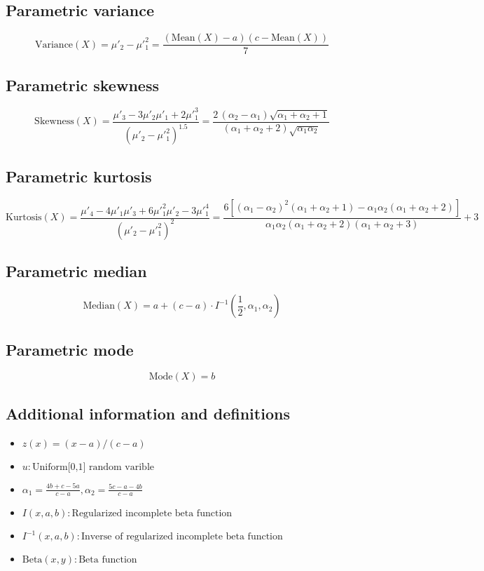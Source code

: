 \documentclass{article}
\begin{document}
\subsection{Parametric variance}
\begin{equation*} \mathrm{Variance}(X)=\mu'_{2}-\mu'^{2}_{1}=\frac{(\mathrm{Mean}(X)-a)(c-\mathrm{Mean}(X))}{7} \end{equation*}
\subsection{Parametric skewness}
\begin{equation*} \mathrm{Skewness}(X)=\frac{\mu'_{3}-3\mu'_{2}\mu'_{1}+2\mu'^{3}_{1}}{(\mu'_{2}-\mu'^{2}_{1})^{1.5}}=\frac{2\,(\alpha_{2}-\alpha_{1})\sqrt{\alpha_{1}+\alpha_{2}+1}}{(\alpha_{1}+\alpha_{2}+2)\sqrt{\alpha_{1}\alpha_{2}}} \end{equation*}
\subsection{Parametric kurtosis}
\begin{equation*} \mathrm{Kurtosis}(X)=\frac{\mu'_{4}-4\mu'_{1}\mu'_{3}+6\mu'^{2}_{1}\mu'_{2}-3\mu'^{4}_{1}}{(\mu'_{2}-\mu'^{2}_{1})^{2}}=\frac{6[(\alpha_{1}-\alpha_{2})^2 (\alpha_{1} +\alpha_{2}+1)-\alpha_{1} \alpha_{2} (\alpha_{1}+\alpha_{2}+2)]}{\alpha_{1} \alpha_{2} (\alpha_{1}+\alpha_{2}+2) (\alpha_{1}+\alpha_{2}+3)}+3 \end{equation*}
\subsection{Parametric median}
\begin{equation*} \mathrm{Median}(X)=a+(c-a)\cdot I^{-1}\left(\frac{1}{2},\alpha_{1},\alpha_{2}\right) \end{equation*}
\subsection{Parametric mode}
\begin{equation*} \mathrm{Mode}(X)=b \end{equation*}
\subsection{Additional information and definitions}
\begin{itemize}
    \item $ z\left(x\right)=\left(x-a\right)/\left(c-a\right) $
    \item $ u:\text{Uniform[0,1] random varible} $
    \item $ \alpha_{1}=\frac{4b+c-5a} {c-a},\alpha_{2}=\frac{5c-a-4b} {c-a} $
    \item $ I\left(x,a,b\right):\text{Regularized incomplete beta function} $
    \item $ I^{-1}\left(x,a,b\right):\text{Inverse of regularized incomplete beta function} $
    \item $ \text{Beta}\left(x,y\right):\text{Beta function} $
\end{itemize}
\end{document}
